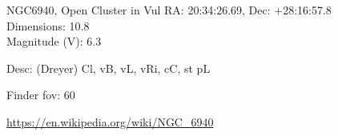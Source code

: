 \begin{block}{NGC6940, Open Cluster in Vul}
    RA: 20:34:26.69, Dec: +28:16:57.8 \\ 
    Dimensions: 10.8 \\ 
    Magnitude (V): 6.3


    Desc: (Dreyer) Cl, vB, vL, vRi, cC, st pL 

    Finder fov: 60 

    \url{https://en.wikipedia.org/wiki/NGC_6940} 
\end{block}